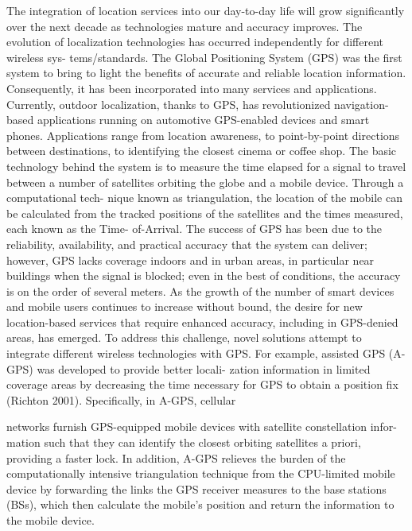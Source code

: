 The integration of location services into our day-to-day life will grow significantly
over the next decade as technologies mature and accuracy improves. The evolution
of localization technologies has occurred independently for different wireless sys-
tems/standards. The Global Positioning System (GPS) was the first system to bring
to light the benefits of accurate and reliable location information. Consequently, it
has been incorporated into many services and applications. Currently, outdoor
localization, thanks to GPS, has revolutionized navigation-based applications
running on automotive GPS-enabled devices and smart phones. Applications range
from location awareness, to point-by-point directions between destinations, to
identifying the closest cinema or coffee shop. The basic technology behind the
system is to measure the time elapsed for a signal to travel between a number of
satellites orbiting the globe and a mobile device. Through a computational tech-
nique known as triangulation, the location of the mobile can be calculated from the
tracked positions of the satellites and the times measured, each known as the Time-
of-Arrival. The success of GPS has been due to the reliability, availability, and
practical accuracy that the system can deliver; however, GPS lacks coverage
indoors and in urban areas, in particular near buildings when the signal is blocked;
even in the best of conditions, the accuracy is on the order of several meters.
As the growth of the number of smart devices and mobile users continues to
increase without bound, the desire for new location-based services that require
enhanced accuracy, including in GPS-denied areas, has emerged. To address this
challenge, novel solutions attempt to integrate different wireless technologies with
GPS. For example, assisted GPS (A-GPS) was developed to provide better locali-
zation information in limited coverage areas by decreasing the time necessary for
GPS to obtain a position fix (Richton 2001). Specifically, in A-GPS, cellular

networks furnish GPS-equipped mobile devices with satellite constellation infor-
mation such that they can identify the closest orbiting satellites a priori, providing a
faster lock. In addition, A-GPS relieves the burden of the computationally intensive
triangulation technique from the CPU-limited mobile device by forwarding the links
the GPS receiver measures to the base stations (BSs), which then calculate the
mobile’s position and return the information to the mobile device.



